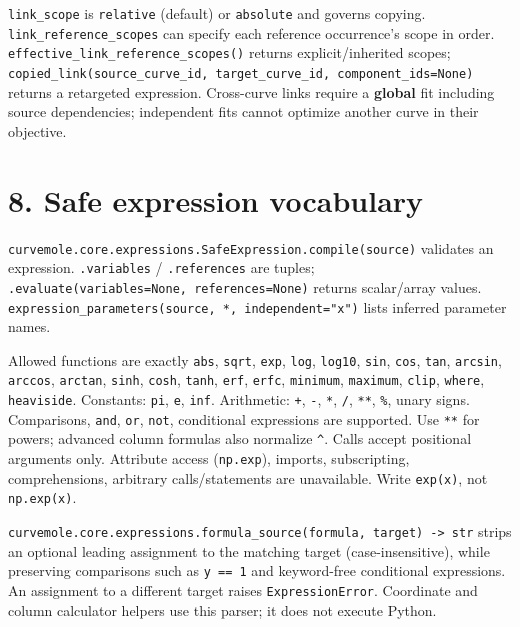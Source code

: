 \documentclass[
  10pt,
  a4paper,
  oneside]{scrreprt}
\begin{document}
\texttt{link\_scope} is \texttt{relative} (default) or \texttt{absolute}
and governs copying. \texttt{link\_reference\_scopes} can specify each
reference occurrence's scope in order.
\texttt{effective\_link\_reference\_scopes()} returns explicit/inherited
scopes;
\texttt{copied\_link(source\_curve\_id,\ target\_curve\_id,\ component\_ids=None)}
returns a retargeted expression. Cross-curve links require a
\textbf{global} fit including source dependencies; independent fits
cannot optimize another curve in their objective.

\hypertarget{safe-expression-vocabulary}{%
\section{8. Safe expression
vocabulary}\label{safe-expression-vocabulary}}

\texttt{curvemole.core.expressions.SafeExpression.compile(source)}
validates an expression. \texttt{.variables} / \texttt{.references} are
tuples; \texttt{.evaluate(variables=None,\ references=None)} returns
scalar/array values.
\texttt{expression\_parameters(source,\ *,\ independent="x")} lists
inferred parameter names.

Allowed functions are exactly \texttt{abs}, \texttt{sqrt}, \texttt{exp},
\texttt{log}, \texttt{log10}, \texttt{sin}, \texttt{cos}, \texttt{tan},
\texttt{arcsin}, \texttt{arccos}, \texttt{arctan}, \texttt{sinh},
\texttt{cosh}, \texttt{tanh}, \texttt{erf}, \texttt{erfc},
\texttt{minimum}, \texttt{maximum}, \texttt{clip}, \texttt{where},
\texttt{heaviside}. Constants: \texttt{pi}, \texttt{e}, \texttt{inf}.
Arithmetic: \texttt{+}, \texttt{-}, \texttt{*}, \texttt{/}, \texttt{**},
\texttt{\%}, unary signs. Comparisons, \texttt{and}, \texttt{or},
\texttt{not}, conditional expressions are supported. Use \texttt{**} for
powers; advanced column formulas also normalize \texttt{\^{}}. Calls
accept positional arguments only. Attribute access (\texttt{np.exp}),
imports, subscripting, comprehensions, arbitrary calls/statements are
unavailable. Write \texttt{exp(x)}, not \texttt{np.exp(x)}.

\texttt{curvemole.core.expressions.formula\_source(formula,\ target)\ -\textgreater{}\ str}
strips an optional leading assignment to the matching target
(case-insensitive), while preserving comparisons such as
\texttt{y\ ==\ 1} and keyword-free conditional expressions. An
assignment to a different target raises \texttt{ExpressionError}.
Coordinate and column calculator helpers use this parser; it does not
execute Python.
\end{document}

